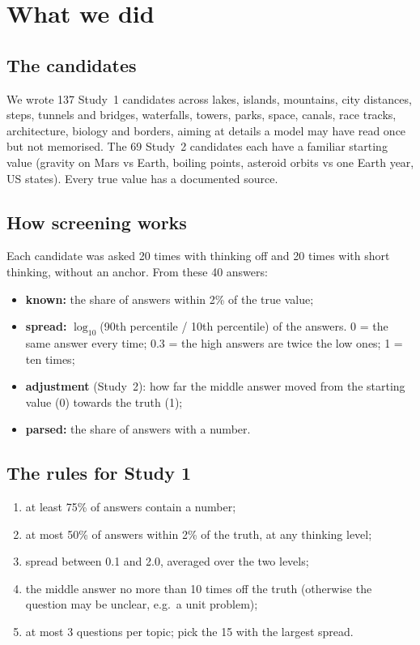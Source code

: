 \documentclass[11pt,a4paper]{article}
\begin{document}
\section{What we did}

\subsection{The candidates}
We wrote 137 Study~1 candidates across lakes, islands, mountains, city distances, steps, tunnels and bridges, waterfalls, towers, parks, space, canals, race tracks, architecture, biology and borders, aiming at details a model may have read once but not memorised. The 69 Study~2 candidates each have a familiar starting value (gravity on Mars vs Earth, boiling points, asteroid orbits vs one Earth year, US states). Every true value has a documented source.

\subsection{How screening works}
Each candidate was asked 20 times with thinking off and 20 times with short thinking, without an anchor. From these 40 answers:
\begin{itemize}[leftmargin=*]
  \item \textbf{known:} the share of answers within 2\% of the true value;
  \item \textbf{spread:} $\log_{10}$(90th percentile / 10th percentile) of the answers. 0 = the same answer every time; 0.3 = the high answers are twice the low ones; 1 = ten times;
  \item \textbf{adjustment} (Study~2): how far the middle answer moved from the starting value (0) towards the truth (1);
  \item \textbf{parsed:} the share of answers with a number.
\end{itemize}

\subsection{The rules for Study 1}
\begin{enumerate}[leftmargin=*]
  \item at least 75\% of answers contain a number;
  \item at most 50\% of answers within 2\% of the truth, at any thinking level;
  \item spread between 0.1 and 2.0, averaged over the two levels;
  \item the middle answer no more than 10 times off the truth (otherwise the question may be unclear, e.g.\ a unit problem);
  \item at most 3 questions per topic; pick the 15 with the largest spread.
\end{enumerate}
\end{document}
